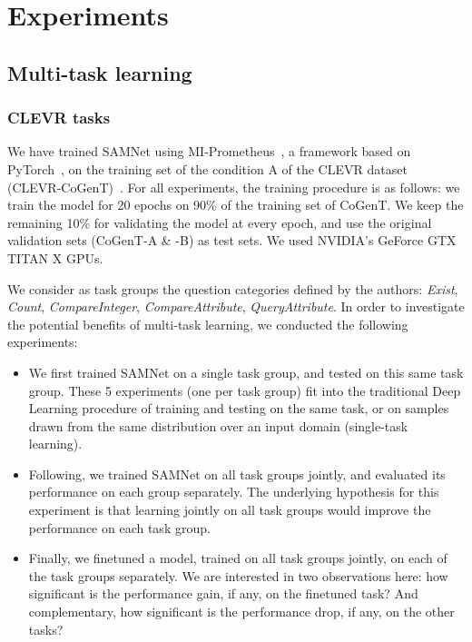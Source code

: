 \section{Experiments}

\subsection{Multi-task learning}

\subsubsection{CLEVR tasks}

We have trained SAMNet using MI-Prometheus~\cite{kornuta2018accelerating}, a framework based on PyTorch~\cite{paszke2017automatic}, on the training set of the condition A of the CLEVR dataset (CLEVR-CoGenT)~\cite{johnson2017clevr}.
For all experiments, the training procedure is as follows: we train the model for 20 epochs on 90\% of the training set of CoGenT. We keep the remaining 10\% for validating the model at every epoch, and use the original validation sets (CoGenT-A  \& -B) as test sets. We used NVIDIA's GeForce GTX TITAN X GPUs.

We consider as task groups the question categories defined by the authors: \textit{Exist}, \textit{Count}, \textit{CompareInteger}, \textit{CompareAttribute}, \textit{QueryAttribute}. In order to investigate the potential benefits of multi-task learning, we conducted the following experiments:

\begin{itemize}
	\item We first trained SAMNet on a single task group, and tested on this same task group. These 5 experiments (one per task group) fit into the traditional Deep Learning procedure of training and testing on the same task, or on samples drawn from the same distribution over an input domain (single-task learning).
	\item Following, we trained SAMNet on all task groups jointly, and evaluated its performance on each group separately. The underlying hypothesis for this experiment is that learning jointly on all task groups would improve the performance on each task group.
	\item Finally, we finetuned a model, trained on all task groups jointly, on each of the task groups separately. We are interested in two observations here: how significant is the performance gain, if any, on the finetuned task? And complementary, how significant is the performance drop, if any, on the other tasks? 
\end{itemize}

